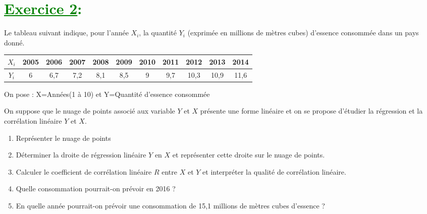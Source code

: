 \documentclass[12pt]{article}
\begin{document}
\section*{\textcolor{green}{\underline{Exercice 2}:}}

Le tableau suivant indique, pour l'année \(X_i\), la quantité \(Y_i\) (exprimée en millions de mètres cubes) d'essence consommée dans un pays donné.

\begin{tabular}{|c|c|c|c|c|c|c|c|c|c|c|}
  \hline
  $X_{i}$ & 2005 & 2006 & 2007 & 2008 & 2009 & 2010 & 2011 & 2012 & 2013 & 2014 \\
  \hline
  $Y_{i}$ & 6 & 6,7 & 7,2 & 8,1 & 8,5 & 9 & 9,7 & 10,3 & 10,9 & 11,6 \\
  \hline
\end{tabular}

On pose : X=Années(1 à 10) et Y=Quantité d'essence consommée

On suppose que le nuage de points associé aux variable \(Y\) et \(X\) présente une forme linéaire et on se propose d'étudier la régression et la corrélation linéaire \(Y\) et \(X\).
\begin{enumerate}
  \item Représenter le nuage de points
  \item Déterminer la droite de régression linéaire \(Y\) en \(X\) et représenter cette droite sur le nuage de points.
  \item Calculer le coefficient de corrélation linéaire \(R\) entre \(X\) et \(Y\) et interpréter la qualité de corrélation linéaire.
  \item Quelle consommation pourrait-on prévoir en 2016 ?
  \item En quelle année pourrait-on prévoir une consommation de 15,1 millions de mètres cubes d'essence ?
\end{enumerate}
\end{document}
